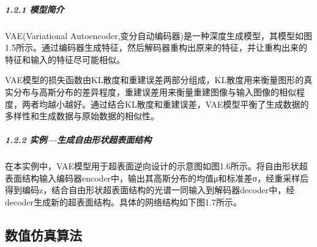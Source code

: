 \documentclass[letterpaper,10pt,english]{sphinxmanual}
\begin{document}
\subparagraph{1.2.1 模型简介}
\label{\detokenize{_u7b80_u4ecb/_u6838_u5fc3_u8bbe_u8ba1_u4f18_u5316_u7b97_u6cd5/_u6df1_u5ea6_u5b66_u4e60_u6a21_u5757/_u6df1_u5ea6_u5b66_u4e60_u6a21_u578b:id7}}
\sphinxAtStartPar
VAE(Variational Autoencoder,变分自动编码器)是一种深度生成模型，其模型如图1.5所示。通过编码器生成特征，然后解码器重构出原来的特征，并让重构出来的特征和输入的特征尽可能相似。


\sphinxAtStartPar
{}





\sphinxAtStartPar
VAE模型的损失函数由KL散度和重建误差两部分组成，KL散度用来衡量图形的真实分布与高斯分布的差异程度，重建误差用来衡量重建图像与输入图像的相似程度，两者均越小越好。通过结合KL散度和重建误差，VAE模型平衡了生成数据的多样性和生成数据与原始数据的相似性。


\subparagraph{1.2.2 实例—生成自由形状超表面结构}
\label{\detokenize{_u7b80_u4ecb/_u6838_u5fc3_u8bbe_u8ba1_u4f18_u5316_u7b97_u6cd5/_u6df1_u5ea6_u5b66_u4e60_u6a21_u5757/_u6df1_u5ea6_u5b66_u4e60_u6a21_u578b:id8}}
\sphinxAtStartPar


\sphinxAtStartPar
{}





\sphinxAtStartPar
在本实例中，VAE模型用于超表面逆向设计的示意图如图1.6所示。将自由形状超表面结构输入编码器encoder中，输出其高斯分布的均值μ和标准差σ，经重采样后得到编码z，结合自由形状超表面结构的光谱一同输入到解码器decoder中，经decoder生成新的超表面结构。具体的网络结构如下图1.7所示。


\sphinxAtStartPar
{}







\sphinxstepscope


\subsection{数值仿真算法}
\label{\detokenize{_u7b80_u4ecb/_u6838_u5fc3_u8bbe_u8ba1_u4f18_u5316_u7b97_u6cd5/_u6570_u503c_u4eff_u771f_u6a21_u5757/_u6570_u503c_u4eff_u771f_u7b97_u6cd5:id1}}\label{\detokenize{_u7b80_u4ecb/_u6838_u5fc3_u8bbe_u8ba1_u4f18_u5316_u7b97_u6cd5/_u6570_u503c_u4eff_u771f_u6a21_u5757/_u6570_u503c_u4eff_u771f_u7b97_u6cd5::doc}}
\end{document}
